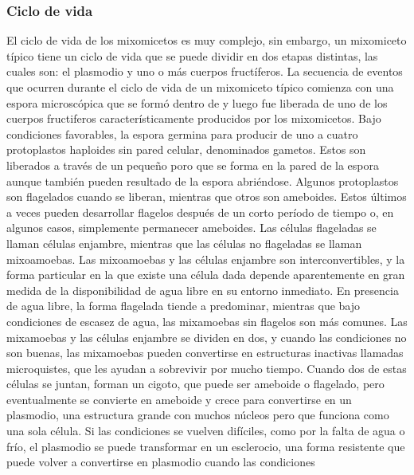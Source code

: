 \subsubsection{Ciclo de vida}
    El ciclo de vida de los mixomicetos es muy complejo, sin embargo, un mixomiceto t\'ipico
        tiene un ciclo de vida que se puede dividir en dos etapas distintas, las cuales son:
        el plasmodio y uno o m\'as cuerpos fruct\'iferos.\cite{Stephenson1994}
    \vskip 0.5cm
    La secuencia de eventos que ocurren durante el ciclo de vida de un mixomiceto t\'ipico comienza con una espora 
        microsc\'opica que se form\'o dentro de y luego fue liberada de uno de los cuerpos fructiferos caracter\'isticamente 
        producidos por los mixomicetos. Bajo condiciones favorables, la espora germina para producir de uno a cuatro protoplastos haploides sin pared
        celular, denominados gametos. Estos son liberados a trav\'es de un peque\~no poro que se forma en la pared de la espora aunque tambi\'en pueden resultado 
        de la espora abri\'endose.
    \vskip 0.5cm
    Algunos protoplastos son flagelados cuando se liberan, mientras que otros son ameboides. Estos \'ultimos a veces pueden desarrollar flagelos despu\'es de un 
        corto per\'iodo de tiempo o, en algunos casos, simplemente permanecer ameboides. Las c\'elulas flageladas se llaman c\'elulas enjambre, mientras que las 
        c\'elulas no flageladas se llaman mixoamoebas. Las mixoamoebas y las c\'elulas enjambre son interconvertibles, y la forma particular en la que existe una 
        c\'elula dada depende aparentemente en gran medida de la disponibilidad de agua libre en su entorno inmediato. En presencia de agua libre, la forma 
        flagelada tiende a predominar, mientras que bajo condiciones de escasez de agua, las mixamoebas sin flagelos son m\'as comunes.\cite{Stephenson1994}
    \vskip 0.5cm
    Las mixamoebas y las c\'elulas enjambre se dividen en dos, y cuando las condiciones no son buenas, 
        las mixamoebas pueden convertirse en estructuras inactivas llamadas microquistes, que les ayudan a sobrevivir 
        por mucho tiempo. Cuando dos de estas c\'elulas se juntan, forman un cigoto, que puede ser ameboide o flagelado, pero 
        eventualmente se convierte en ameboide y crece para convertirse en un plasmodio, una estructura grande con muchos n\'ucleos 
        pero que funciona como una sola c\'elula. Si las condiciones se vuelven dif\'iciles, como por la falta de agua o fr\'io, el plasmodio 
        se puede transformar en un esclerocio, una forma resistente que puede volver a convertirse en plasmodio cuando las condiciones 
